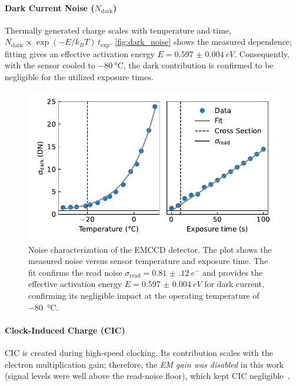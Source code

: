 \documentclass[
	a4paper,
]{scrarticle}
\begin{document}
\paragraph{Dark Current Noise ($N_{\text{dark}}$)}
Thermally generated charge scales with temperature and time,
\(N_\text{dark}\propto \exp(-E/k_B T)\,t_\text{exp}\).
\autoref{fig:dark_noise} shows the measured dependence; fitting gives an effective activation energy \(E=\SI{0.597(4)}{eV}\).
Consequently, with the sensor cooled to $\SI{-80}{\degreeCelsius}$, the dark contribution is confirmed to be negligible for the utilized exposure times.

\begin{figure}[h]
    \centering
    \includegraphics{../analysis/figures/dark_noise.pdf}
    \caption{Noise characterization of the EMCCD detector. The plot shows the measured noise versus sensor temperature and exposure time. The fit confirms the read noise $\sigma_{\text{read}}=\SI{0.81(12)}{e^{-}}$ and provides the effective activation energy $E=\SI{0.597(4)}{eV}$ for dark current, confirming its negligible impact at the operating temperature of \SI{-80}{\degreeCelsius}.}
    \label{fig:dark_noise}
\end{figure}

\paragraph{Clock-Induced Charge (CIC)}
CIC is created during high-speed clocking.
Its contribution scales with the electron multiplication gain; therefore, the \emph{EM gain was disabled} in this work (signal levels were well above the read-noise floor), which kept CIC negligible~\cite{andorEstablishingSensitivityScientifica}.
\end{document}
